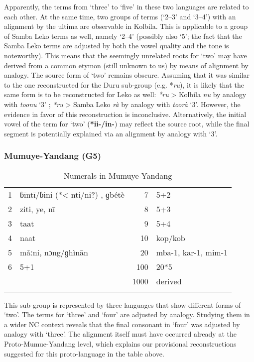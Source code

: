 Apparently, the terms from ‘three’ to ‘five’ in these two languages are related to each other. At the same time, two groups of terms (‘2--3’ and ‘3--4’) with an alignment by the ultima are observable in Kolbila. This is applicable to a group of Samba Leko terms as well, namely ‘2--4’ (possibly also ‘5’; the fact that the Samba Leko terms are adjusted by both the vowel quality and the tone is noteworthy). This means that the seemingly unrelated roots for ‘two’ may have derived from a common etymon (still unknown to us) by means of alignment by analogy. The source form of ‘two’ remains obscure. Assuming that it was similar to the one reconstructed for the Duru sub-group (e.g. *\textit{ru}), it is likely that the same form is to be reconstructed for Leko as well: \textit{*ru} > Kolbila \textit{nu} by analogy with \textit{toonu} ‘3’ ; \textit{*ru} > Samba Leko \textit{rà} by analogy with \textit{toorà} ‘3’. However, the evidence in favor of this reconstruction is inconclusive. Alternatively, the initial vowel of the term for ‘two’ (\textbf{*ii-/in-}) may reflect the source root, while the final segment is potentially explained via an alignment by analogy with `3'.

\subsubsection{Mumuye-Yandang (G5)}%
\begin{table}
\caption{\label{tab:3:108}Numerals in Mumuye-Yandang}


\begin{tabularx}{\textwidth}{lQrQ}
\lsptoprule

1 & ɓīntī/ɓini (*< nti/ni?) , ɡbétè & 7 & 5+2\\
2 & ziti, ye, nī & 8 & 5+3\\
3 & taat & 9 & 5+4\\
4 & naat & 10 & kop/kob\\
5 & m{\v{a}}ːni, nɔng/ɡhìnān & 20 & mba-1, kar-1, mim-1\\
6 & 5+1 & 100 & 20*5\\
&  & 1000 & derived\\
\lspbottomrule
\end{tabularx}
\end{table}

This sub-group is represented by three languages that show different forms of ‘two’. The terms for ‘three’ and ‘four’ are adjusted by analogy. Studying them in a wider NC context reveals that the final consonant in ‘four’ was adjusted by analogy with ‘three’. The alignment itself must have occurred already at the Proto-Mumue-Yandang level, which explains our provisional reconstructions suggested for this proto-language in the table above.

